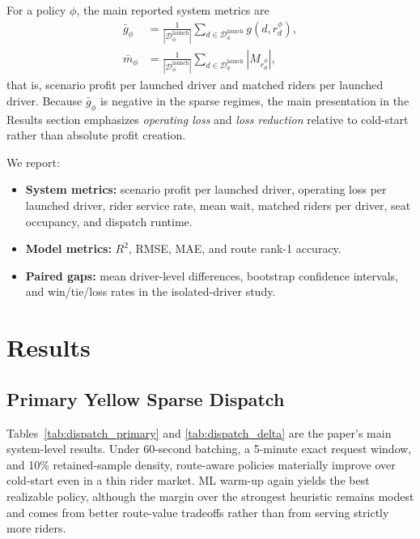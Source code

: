 \documentclass[journal]{IEEEtran}
\begin{document}
For a policy \(\phi\), the main reported system metrics are
\begin{equation}
\begin{aligned}
\bar g_\phi &= \frac{1}{|\mathcal{D}_\phi^{\mathrm{launch}}|}
\sum_{d \in \mathcal{D}_\phi^{\mathrm{launch}}} g(d,r_d^\phi),\\
\bar m_\phi &= \frac{1}{|\mathcal{D}_\phi^{\mathrm{launch}}|}
\sum_{d \in \mathcal{D}_\phi^{\mathrm{launch}}} |M_{r_d^\phi}|,
\end{aligned}
\end{equation}
that is, scenario profit per launched driver and matched riders per launched driver. Because \(\bar g_\phi\) is negative in the sparse regimes, the main presentation in the Results section emphasizes \emph{operating loss} and \emph{loss reduction} relative to cold-start rather than absolute profit creation.

We report:
\begin{itemize}
    \item \textbf{System metrics:} scenario profit per launched driver, operating loss per launched driver, rider service rate, mean wait, matched riders per driver, seat occupancy, and dispatch runtime.
    \item \textbf{Model metrics:} \(R^2\), RMSE, MAE, and route rank-1 accuracy.
    \item \textbf{Paired gaps:} mean driver-level differences, bootstrap confidence intervals, and win/tie/loss rates in the isolated-driver study.
\end{itemize}

\section{Results}
\subsection{Primary Yellow Sparse Dispatch}
Tables~\ref{tab:dispatch_primary} and \ref{tab:dispatch_delta} are the paper's main system-level results. Under 60-second batching, a 5-minute exact request window, and 10\% retained-sample density, route-aware policies materially improve over cold-start even in a thin rider market. ML warm-up again yields the best realizable policy, although the margin over the strongest heuristic remains modest and comes from better route-value tradeoffs rather than from serving strictly more riders.
\end{document}
